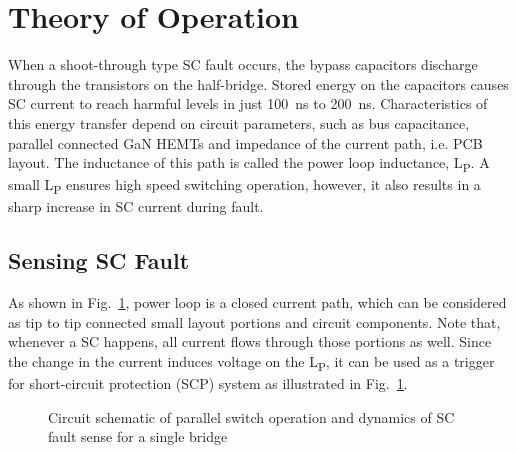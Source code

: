 \documentclass[journal]{IEEEtran}
\begin{document}
\section{Theory of Operation}

When a shoot-through type SC fault occurs, the bypass capacitors discharge through the transistors on the half-bridge. Stored energy on the capacitors causes SC current to reach harmful levels in just 100~ns to 200~ns. Characteristics of this energy transfer depend on circuit parameters, such as bus capacitance, parallel connected GaN HEMTs and impedance of the current path, i.e. PCB layout. The inductance of this path is called the power loop inductance, L\textsubscript{P}. A small L\textsubscript{P} ensures high speed switching operation, however, it also results in a sharp increase in SC current during fault.

\subsection{Sensing SC Fault}

As shown in Fig.~\ref{fig_DynamicsandSchematic}, power loop is a closed current path, which can be considered as tip to tip connected  small layout portions and circuit components. Note that, whenever a SC happens, all current flows through those portions as well. Since the change in the current induces voltage on the L\textsubscript{P}, it can be used as a trigger for short-circuit protection (SCP) system as illustrated in Fig.~\ref{fig_DynamicsandSchematic}.


\begin{figure}[]
    \caption{Circuit schematic of parallel switch operation and dynamics of SC fault sense for a single bridge}
    \label{fig_DynamicsandSchematic}
\end{figure}
\end{document}
